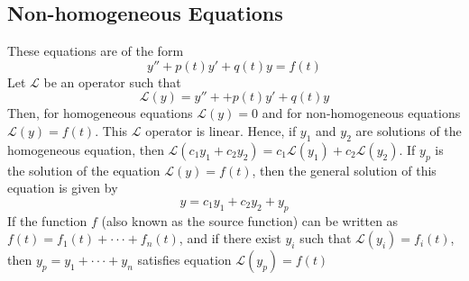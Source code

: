 \documentclass[10pt]{article}
\begin{document}
        \subsection{Non-homogeneous Equations}
            These equations are of the form $$y'' + p(t)y' + q(t)y = f(t)$$
            Let $\mathcal{L}$ be an operator such that $$\mathcal{L}(y) = y'' + + p(t)y' + q(t)y$$ Then, for homogeneous equations $\mathcal{L}(y) = 0$ and for non-homogeneous equations $\mathcal{L}(y) = f(t)$. This $\mathcal{L}$ operator is linear. Hence, if $y_1$ and $y_2$ are solutions of the homogeneous equation, then $\mathcal{L}(c_1y_1 + c_2y_2) = c_1\mathcal{L}(y_1) +c_2\mathcal{L}(y_2)$. If $y_p$ is the solution of the equation $\mathcal{L}(y) = f(t)$, then the general solution of this equation is given by $$y = c_1y_1 + c_2y_2 + y_p$$ 
            If the function $f$ (also known as the source function) can be written as $f(t) = f_1(t) + \cdot \cdot \cdot + f_n(t)$, and if there exist $y_i$ such that $\mathcal{L}(y_i) = f_i(t)$, then $y_p = y_1 + \cdot \cdot \cdot + y_n$ satisfies equation $\mathcal{L}(y_p) = f(t)$
\end{document}
